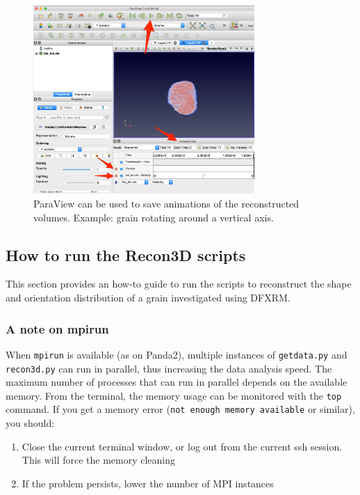 \documentclass[11pt]{scrartcl}
\begin{document}
\begin{figure}[h]
    \centering
    \includegraphics[width=0.75\textwidth]{Animation.png}
    \caption{ParaView can be used to save animations of the reconstructed volumes. Example: grain rotating around a vertical axis.}
    \label{fig:PW_animation}
\end{figure}

\subsection{How to run the Recon3D scripts}
\label{sec:run_scripts}

This section provides an how-to guide to run the scripts to reconstruct the shape and orientation distribution of a grain investigated using {\footnotesize{DFXRM}}.

\subsubsection{A note on mpirun}
\label{sec:mpirun}

When {\texttt{mpirun}} is available (as on Panda2), multiple instances of {\texttt{getdata.py}} and {\texttt{recon3d.py}} can run in parallel, thus increasing the data analysis speed. The maximum number of processes that can run in parallel depends on the available memory. From the terminal, the memory usage can be monitored with the {\texttt{top}} command. If you get a memory error ({\texttt{not enough memory available}} or similar), you should:
\begin{enumerate}
\item Close the current terminal window, or log out from the current ssh session. This will force the memory cleaning
\item If the problem persists, lower the number of {\footnotesize{MPI}} instances
\end{enumerate}
\end{document}
